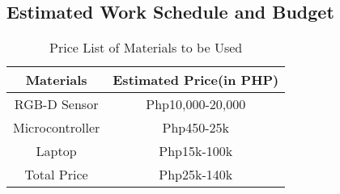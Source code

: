 \subsection{Estimated Work Schedule and Budget}
\begin{table}[!htb]
	\caption{Price List of Materials to be Used}
	\centering
	\begin{tabular}{|c|c|}
		\hline
		Materials & Estimated Price(in PHP) \\
		\hline
		RGB-D Sensor & Php10,000-20,000 \\
		\hline
		Microcontroller & Php450-25k \\
		\hline
		Laptop & Php15k-100k \\
		\hline
		Total Price & Php25k-140k \\
		\hline
	\end{tabular}
\end{table}